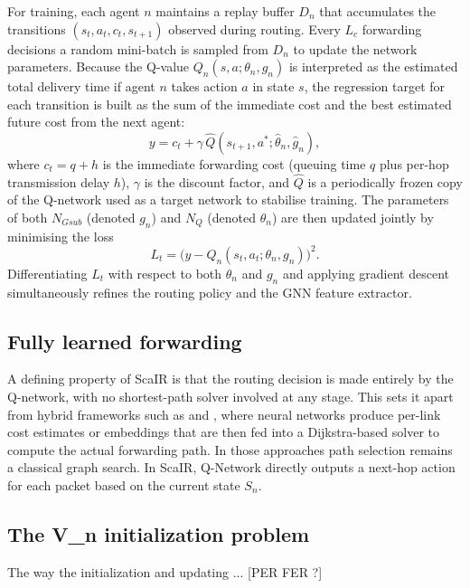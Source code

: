 \documentclass[10pt,twocolumn,letterpaper]{article}
\begin{document}
For training, each agent $n$ maintains a replay buffer $D_n$ that
accumulates the transitions $(s_t, a_t, c_t, s_{t+1})$ observed during
routing. Every $L_c$ forwarding decisions a random mini-batch is
sampled from $D_n$ to update the network parameters. Because the
Q-value $Q_n(s, a;\theta_n, g_n)$ is interpreted as the estimated total
delivery time if agent $n$ takes action $a$ in state $s$, the
regression target for each transition is built as the sum of the
immediate cost and the best estimated future cost from the next agent:
\begin{equation}
  y = c_t + \gamma\,\hat{Q}(s_{t+1}, a^*;\hat{\theta}_n, \hat{g}_n),
  \label{eq:target}
\end{equation}
where $c_t = q + h$ is the immediate forwarding cost (queuing time $q$
plus per-hop transmission delay $h$), $\gamma$ is the discount factor,
and $\hat{Q}$ is a periodically frozen copy of the Q-network used as
a target network to stabilise training. The parameters of both
$N_{Gsub}$ (denoted $g_n$) and $N_Q$ (denoted $\theta_n$) are then
updated jointly by minimising the loss
\begin{equation}
  L_t = \bigl(y - Q_n(s_t, a_t;\theta_n, g_n)\bigr)^2.
  \label{eq:loss}
\end{equation}
Differentiating $L_t$ with respect to both $\theta_n$ and $g_n$ and
applying gradient descent simultaneously refines the routing policy and
the GNN feature extractor.

\subsection{Fully learned forwarding}

A defining property of ScaIR is that the routing decision is made
entirely by the Q-network, with no shortest-path solver involved at any
stage. This sets it apart from hybrid frameworks such as
\cite{upc_routing} and \cite{autognn}, where neural networks produce
per-link cost estimates or embeddings that are then fed into a
Dijkstra-based solver to compute the actual forwarding path. In those
approaches path
selection remains a classical graph search. In ScaIR, Q-Network directly outputs a
next-hop action for each packet based on the current state $S_n$.

\subsection{The V_n initialization problem}

The way the initialization and updating ... [PER FER ?]
\end{document}
